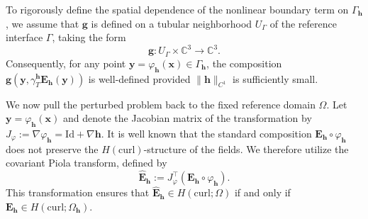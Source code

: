 \documentclass[12pt,reqno]{amsart}
\theoremstyle{definition}
\numberwithin{equation}{section}
\begin{document}
To rigorously define the spatial dependence of the nonlinear boundary term on $\Gamma_{\mathbf{h}}$, we assume that $\mathbf{g}$ is defined on a tubular neighborhood $U_\Gamma$ of the reference interface $\Gamma$, taking the form
\[
\mathbf{g} : U_\Gamma \times \mathbb{C}^3 \to \mathbb{C}^3.
\]
Consequently, for any point $\boldsymbol{y} = \varphi_{\mathbf{h}}(\boldsymbol{x}) \in \Gamma_{\mathbf{h}}$, the composition $\mathbf{g}(\boldsymbol{y}, \gamma_T^{\mathbf{h}}\mathbf{E}_{\mathbf{h}}(\boldsymbol{y}))$ is well-defined provided $\|\mathbf{h}\|_{C^1}$ is sufficiently small.

We now pull the perturbed problem back to the fixed reference domain $\Omega$. Let $\boldsymbol{y} = \varphi_{\mathbf{h}}(\boldsymbol{x})$ and denote the Jacobian matrix of the transformation by $J_{\varphi} := \nabla \varphi_{\mathbf{h}} = \mathrm{Id} + \nabla \mathbf{h}$. It is well known that the standard composition $\mathbf{E}_{\mathbf{h}} \circ \varphi_{\mathbf{h}}$ does not preserve the $H(\mathrm{curl})$-structure of the fields. We therefore utilize the covariant Piola transform, defined by
\begin{equation}\label{eq:piola_transform}
\hat{\mathbf{E}}_{\mathbf{h}} := J_{\varphi}^{\top} (\mathbf{E}_{\mathbf{h}} \circ \varphi_{\mathbf{h}}).
\end{equation}
This transformation ensures that $\hat{\mathbf{E}}_{\mathbf{h}} \in H(\mathrm{curl}; \Omega)$ if and only if $\mathbf{E}_{\mathbf{h}} \in H(\mathrm{curl}; \Omega_{\mathbf{h}})$.
\end{document}
